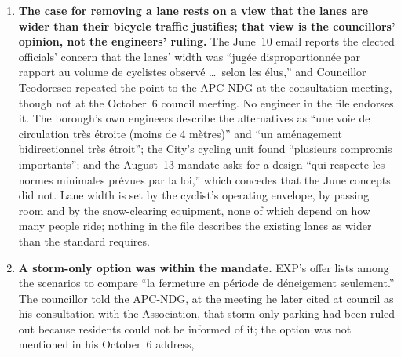 \documentclass[10pt,letterpaper]{article}
\begin{document}
\begin{enumerate}[nosep,itemsep=0.3em,leftmargin=1.4em]
\begin{minipage}[t]{\linewidth}
    the spaces an arrangement ``pourrait permettre de recr\'eer'' and to
    measure ``l'am\'elioration de la disponibilit\'e du stationnement''; the
    offer promises an analysis of ``l'impact sur le nombre de places'' and
    lists no field work; the consultant worked from aerial imagery. Whatever
    the note says about parking is a count of spaces that could be drawn,
    not a measurement of whether they are needed. Nothing in the file
    records how many winter nights parking near Terrebonne is actually
    full.\end{minipage}\vspace{0.35em}
\item \begin{minipage}[t]{\linewidth}\textbf{The case for removing a lane rests on a view that the lanes are
    wider than their bicycle traffic justifies; that view is the
    councillors' opinion, not the engineers' ruling.} The June~10 email
    reports the elected officials' concern that the lanes' width was ``jug\'ee
    disproportionn\'ee par rapport au volume de cyclistes observ\'e \ldots\
    selon les \'elus,'' and Councillor Teodoresco repeated the point to the
    APC-NDG at the consultation meeting, though not at the October~6 council
    meeting. No engineer in the file endorses it. The borough's own engineers
    describe the alternatives as ``une voie de circulation tr\`es \'etroite
    (moins de 4 m\`etres)'' and ``un am\'enagement bidirectionnel tr\`es
    \'etroit''; the City's cycling unit found ``plusieurs compromis
    importants''; and the August~13 mandate asks for a design ``qui respecte
    les normes minimales pr\'evues par la loi,'' which concedes that the June
    concepts did not. Lane width is set by the cyclist's operating envelope,
    by passing room and by the snow-clearing equipment, none of which depend
    on how many people ride; nothing in the file describes the existing
    lanes as wider than the standard requires.\end{minipage}\vspace{0.35em}
\item \begin{minipage}[t]{\linewidth}\textbf{A storm-only option was within the mandate.} EXP's offer
    lists among the scenarios to compare ``la fermeture en p\'eriode de
    d\'eneigement seulement.'' The councillor told the APC-NDG, at the meeting
    he later cited at council as his consultation with the Association, that
    storm-only parking had been ruled out because residents could not be
    informed of it; the option was not mentioned in his October~6 address,

\end{minipage}
\end{enumerate}
\end{document}
